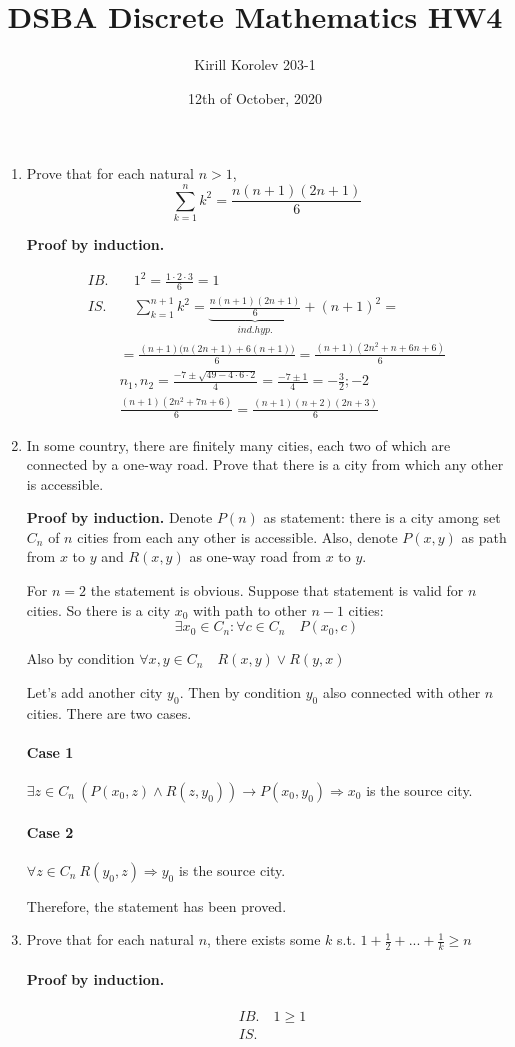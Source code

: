 \documentclass{article}
\title{DSBA Discrete Mathematics HW4}
\author{Kirill Korolev 203-1}
\date{12th of October, 2020}
\begin{document}
\maketitle

\begin{enumerate}
\item Prove that for each natural $n > 1$,
\[\sum_{k=1}^{n} k^2 = \frac{n(n+1)(2n+1)}{6}\]

\textbf{Proof by induction.}

\begin{align*}
IB.& \quad 1^2 = \frac{1 \cdot 2 \cdot 3}{6} = 1\\
IS.& \quad \sum_{k=1}^{n + 1} k^2 = \underbrace{\frac{n(n+1)(2n+1)}{6}}_{ind. hyp.} + (n+1)^2=\\
&=\frac{(n+1)\bigg(n(2n+1) + 6(n+1)\bigg)}{6} = \frac{(n+1)(2n^2 + n + 6n + 6)}{6}\\
&n_1, n_2 = \frac{-7 \pm \sqrt{49 - 4 \cdot 6 \cdot 2}}{4} = \frac{-7 \pm 1}{4} = -\frac{3}{2}; -2\\
&\frac{(n+1)(2n^2 + 7n + 6)}{6} = \frac{(n+1)(n+2)(2n+3)}{6}
\end{align*}

\item In some country, there are finitely many cities, each two of which are connected by a one-way road. Prove that there is a city from which any other is accessible.

\textbf{Proof by induction.} Denote $P(n)$ as statement: there is a city among set $C_n$ of $n$ cities from each any other is accessible. Also, denote $P(x, y)$ as path from $x$ to $y$ and $R(x, y)$ as one-way road from $x$ to $y$.

For $n = 2$ the statement is obvious. Suppose that statement is valid for $n$ cities. So there is a city $x_0$ with path to other $n - 1$ cities:
\[\exists x_0 \in C_n : \forall c \in C_n \quad P(x_0, c) \]

Also by condition $\forall x, y \in C_n \quad R(x, y) \lor R(y, x)$ 

Let's add another city $y_0$. Then by condition $y_0$ also connected with other $n$ cities. There are two cases.

\paragraph{Case 1}
$\exists z \in C_n \: (P(x_0, z) \land R(z, y_0)) \to P(x_0, y_0) \Rightarrow x_0 $ is the source city. 
\paragraph{Case 2}
$\forall z \in C_n \: R(y_0, z) \Rightarrow y_0 $ is the source city.

Therefore, the statement has been proved.

\item Prove that for each natural $n$, there exists some $k$ s.t. $1 + \frac{1}{2} + ... + \frac{1}{k} \geq n$

\paragraph{Proof by induction.}
\begin{align*}
&IB. \quad 1 \geq 1\\
&IS. \quad 
\end{align*}

\end{enumerate}
\end{document}
